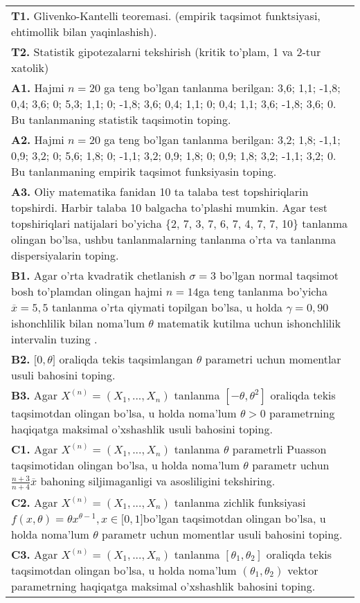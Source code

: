 \documentclass{article}
\begin{document}
\begin{tabular}{m{17cm}}
\textbf{T1.} 
Glivenko-Kantelli teoremasi. (empirik taqsimot funktsiyasi, ehtimollik bilan yaqinlashish).
\\
\textbf{T2.} 
Statistik gipotezalarni tekshirish (kritik to'plam, 1 va 2-tur xatolik)
\\
\textbf{A1.} 
Hajmi \(n = 20\) ga teng bo'lgan tanlanma berilgan: 3,6; 1,1; -1,8; 0,4; 3,6; 0; 5,3; 1,1; 0; -1,8; 3,6; 0,4; 1,1; 0; 0,4; 1,1; 3,6; -1,8; 3,6; 0. Bu tanlanmaning statistik taqsimotin toping.
\\
\textbf{A2.} 
Hajmi \(n = 20\) ga teng bo'lgan tanlanma berilgan: 3,2; 1,8; -1,1; 0,9; 3,2; 0; 5,6; 1,8; 0; -1,1; 3,2; 0,9; 1,8; 0; 0,9; 1,8; 3,2; -1,1; 3,2; 0. Bu tanlanmaning empirik taqsimot funksiyasin toping.
\\
\textbf{A3.} 
Oliy matematika fanidan 10 ta talaba test topshiriqlarin topshirdi. Harbir talaba 10 balgacha to'plashi mumkin. Agar test topshiriqlari natijalari bo'yicha \{2, 7, 3, 7, 6, 7, 4, 7, 7, 10\} tanlanma olingan bo'lsa, ushbu tanlanmalarning tanlanma o'rta va tanlanma dispersiyalarin toping.
\\
\textbf{B1.} 
Agar o'rta kvadratik chetlanish \(\sigma = 3\) bo'lgan normal taqsimot bosh to'plamdan olingan hajmi \(n = 14\)ga teng tanlanma bo'yicha \(\overline{x} = 5,5\) tanlanma o'rta qiymati topilgan bo'lsa, u holda \(\gamma = 0,90\) ishonchlilik bilan noma'lum \(\theta\) matematik kutilma uchun ishonchlilik intervalin tuzing .
\\
\textbf{B2.} 
\(\lbrack 0,\theta\rbrack\) oraliqda tekis taqsimlangan \(\theta\) parametri uchun momentlar usuli bahosini toping.
\\
\textbf{B3.} 
Agar \(X^{(n)} = \left( X_{1},...,X_{n} \right)\) tanlanma \(\left\lbrack - \theta,\theta^{2} \right\rbrack\) oraliqda tekis taqsimotdan olingan bo'lsa, u holda noma'lum \(\theta > 0\) parametrning haqiqatga maksimal o'xshashlik usuli bahosini toping.
\\
\textbf{C1.} 
Agar \(X^{(n)} = \left( X_{1},...,X_{n} \right)\) tanlanma \(\theta\) parametrli Puasson taqsimotidan olingan bo'lsa, u holda noma'lum \(\theta\) parametr uchun \(\frac{n + 3}{n + 4}\overline{x}\) bahoning siljimaganligi va asosliligini tekshiring.
\\
\textbf{C2.} 
Agar \(X^{(n)} = \left( X_{1},...,X_{n} \right)\) tanlanma zichlik funksiyasi\(f(x,\theta) = \theta x^{\theta - 1},x \in \lbrack 0,1\rbrack\)bo'lgan taqsimotdan olingan bo'lsa, u holda noma'lum \(\theta\) parametr uchun momentlar usuli bahosini toping.
\\
\textbf{C3.} 
Agar \(X^{(n)} = \left( X_{1},...,X_{n} \right)\) tanlanma \(\left\lbrack \theta_{1},\theta_{2} \right\rbrack\) oraliqda tekis taqsimotdan olingan bo'lsa, u holda noma'lum \(\left( \theta_{1},\theta_{2} \right)\) vektor parametrning haqiqatga maksimal o'xshashlik bahosini toping.
\\

\end{tabular}
\vspace{1cm}
\end{document}
